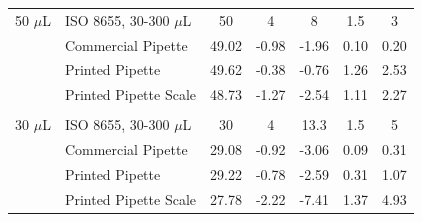 \documentclass{naturegraphicx}
\begin{document}
\begin{table}
\begin{adjustwidth}{-0.75in}{-1.0in}
\begin{tabular}{llccccc}
50 $\mu$L  & ISO 8655, 30-300 $\mu$L   & 50     & 4                & 8            & 1.5          & 3             \\
& Commercial Pipette    & 49.02  & -0.98            & -1.96        & 0.10         & 0.20          \\
& Printed Pipette       & 49.62  & -0.38            & -0.76        & 1.26         & 2.53          \\
& Printed Pipette Scale & 48.73  & -1.27            & -2.54        & 1.11         & 2.27          \\
&                       &        &                  &              &              &               \\
30 $\mu$L  & ISO 8655, 30-300 $\mu$L   & 30     & 4                & 13.3         & 1.5          & 5             \\
& Commercial Pipette    & 29.08  & -0.92            & -3.06        & 0.09         & 0.31          \\
& Printed Pipette       & 29.22  & -0.78            & -2.59        & 0.31         & 1.07          \\
& Printed Pipette Scale & 27.78  & -2.22            & -7.41        & 1.37         & 4.93          \\        
\end{tabular}
\end{adjustwidth}
\end{table}
\end{document}
